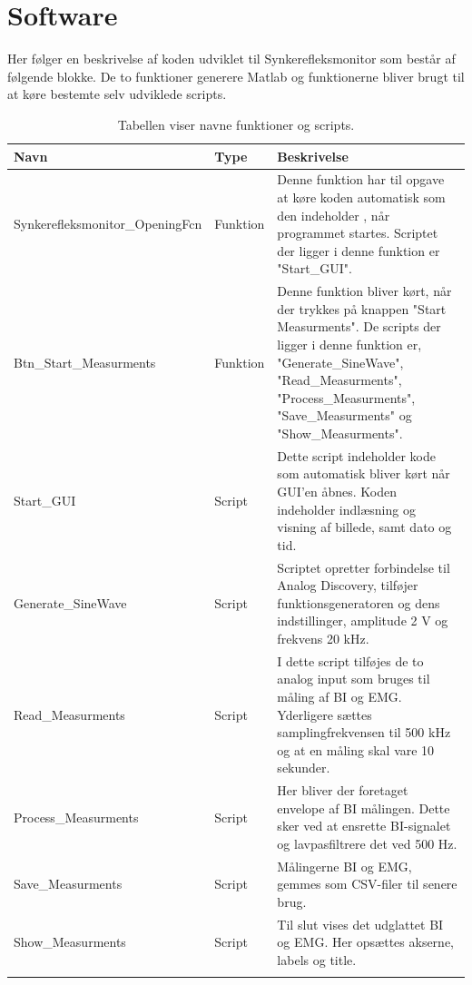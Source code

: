 \chapter{Software}
Her følger en beskrivelse af koden udviklet til Synkerefleksmonitor som består af følgende blokke. De to funktioner generere Matlab og funktionerne bliver brugt til at køre bestemte selv udviklede scripts.


\begin{table}[H]

\begin{tabularx}{\textwidth}{l l X}
     Navn	&	Type		&	Beskrivelse \\ \midrule
     Synkerefleksmonitor\_OpeningFcn   	& 	Funktion  	& 	Denne funktion har til opgave at køre koden automatisk som den indeholder , når programmet startes. Scriptet der ligger i denne funktion er "Start\_GUI".  \\ 			  \addlinespace[2mm]
     Btn\_Start\_Measurments	&	Funktion	&	Denne funktion bliver kørt, når der trykkes på knappen "Start Measurments". De scripts der ligger i denne funktion er, "Generate\_SineWave", "Read\_Measurments", "Process\_Measurments", "Save\_Measurments" og "Show\_Measurments". \\   \addlinespace[2mm]
     Start\_GUI	&	Script	&	Dette script indeholder kode som automatisk bliver kørt når GUI'en åbnes. Koden indeholder indlæsning og visning af billede, samt dato og tid. \\   \addlinespace[2mm]
     Generate\_SineWave	&	Script	&	Scriptet opretter forbindelse til Analog Discovery, tilføjer funktionsgeneratoren og dens indstillinger, amplitude 2 V og frekvens 20 kHz.\\   \addlinespace[2mm]
     Read\_Measurments	&	Script	&	I dette script tilføjes de to analog input som bruges til måling af BI og EMG. Yderligere sættes samplingfrekvensen til 500 kHz og at en måling skal vare 10 sekunder.\\   \addlinespace[2mm]
     Process\_Measurments	&	Script	&	Her bliver der foretaget envelope af BI målingen. Dette sker ved at ensrette BI-signalet og lavpasfiltrere det ved 500 Hz.   \\   \addlinespace[2mm]
     Save\_Measurments	&	Script	&	Målingerne BI og EMG, gemmes som CSV-filer til senere brug.\\   \addlinespace[2mm]
     Show\_Measurments	&	Script	&	Til slut vises det udglattet BI og EMG. Her opsættes akserne, labels og title.\\   \addlinespace[2mm]
   
     \bottomrule                                                                                                                   
    \end{tabularx}
    \caption {Tabellen viser navne funktioner og scripts.}
    \label{tab:sw1}
	
\end{table}







